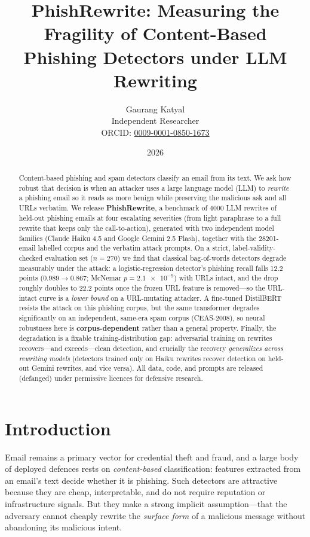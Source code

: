 \documentclass[11pt]{article}
\title{PhishRewrite: Measuring the Fragility of Content-Based\\
Phishing Detectors under LLM Rewriting}
\author{%
  Gaurang Katyal\\
  \normalsize Independent Researcher\\
  \normalsize ORCID: \href{https://orcid.org/0009-0001-0850-1673}{0009-0001-0850-1673}%
}
\date{2026}
\begin{document}
\maketitle

\begin{abstract}
Content-based phishing and spam detectors classify an email from its text. We ask
how robust that decision is when an attacker uses a large language model (LLM) to
\emph{rewrite} a phishing email so it reads as more benign while preserving the
malicious ask and all URLs verbatim. We release \textbf{PhishRewrite}, a benchmark
of \num{4000} LLM rewrites of held-out phishing emails at four escalating
severities (from light paraphrase to a full rewrite that keeps only the
call-to-action), generated with two independent model families (Claude Haiku 4.5
and Google Gemini 2.5 Flash), together with the \num{28201}-email labelled corpus
and the verbatim attack prompts. On a strict, label-validity-checked evaluation set
($n=270$) we find that classical bag-of-words detectors degrade measurably under
the attack: a logistic-regression detector's phishing recall falls
12.2 points ($0.989\!\to\!0.867$; McNemar $p=\num{2.1e-9}$) with URLs intact,
and the drop roughly doubles to 22.2 points once the frozen URL feature is
removed---so the URL-intact curve is a \emph{lower bound} on a URL-mutating
attacker. A fine-tuned DistilBERT resists the attack on this phishing corpus, but
the same transformer degrades significantly on an independent, same-era spam
corpus (CEAS-2008), so neural robustness here is \textbf{corpus-dependent} rather
than a general property. Finally, the degradation is a fixable
training-distribution gap: adversarial training on rewrites recovers---and
exceeds---clean detection, and crucially the recovery \emph{generalizes across
rewriting models} (detectors trained only on Haiku rewrites recover detection on
held-out Gemini rewrites, and vice versa). All data, code, and prompts are released
(defanged) under permissive licences for defensive research.
\end{abstract}

\section{Introduction}
Email remains a primary vector for credential theft and fraud, and a large body of
deployed defences rests on \emph{content-based} classification: features extracted
from an email's text decide whether it is phishing. Such detectors are attractive
because they are cheap, interpretable, and do not require reputation or
infrastructure signals. But they make a strong implicit assumption---that the
adversary cannot cheaply rewrite the \emph{surface form} of a malicious message
without abandoning its malicious intent.
\end{document}
